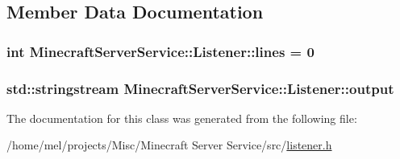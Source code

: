 \subsection{Member Data Documentation}
\subsubsection[{\texorpdfstring{lines}{lines}}]{\setlength{\rightskip}{0pt plus 5cm}int Minecraft\+Server\+Service\+::\+Listener\+::lines = 0}\hypertarget{class_minecraft_server_service_1_1_listener_a1bed886443746d8b4ac0660b3b8d5c80}{}\label{class_minecraft_server_service_1_1_listener_a1bed886443746d8b4ac0660b3b8d5c80}
\subsubsection[{\texorpdfstring{output}{output}}]{\setlength{\rightskip}{0pt plus 5cm}std\+::stringstream Minecraft\+Server\+Service\+::\+Listener\+::output}\hypertarget{class_minecraft_server_service_1_1_listener_a07e00dca9f25dd4e56700da375b0b17b}{}\label{class_minecraft_server_service_1_1_listener_a07e00dca9f25dd4e56700da375b0b17b}


The documentation for this class was generated from the following file\+:\begin{DoxyCompactItemize}
\item 
/home/mel/projects/\+Misc/\+Minecraft Server Service/src/\hyperlink{listener_8h}{listener.\+h}\end{DoxyCompactItemize}
